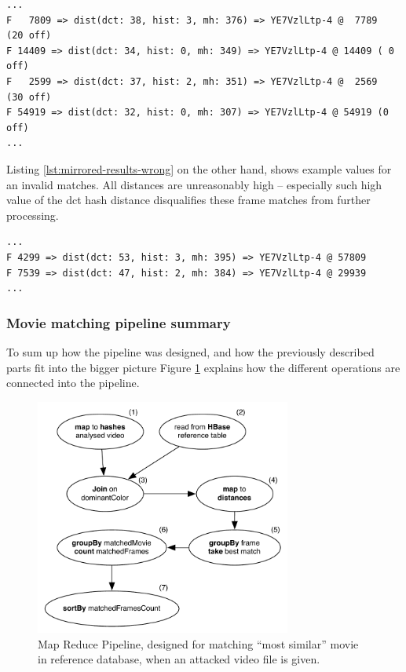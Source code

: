 \begin{lstlisting}[caption={Examples of valid ``best'' matches for a few sample frames (mirrored movie).}, label={lst:mirrored-results}]
...
F   7809 => dist(dct: 38, hist: 3, mh: 376) => YE7VzlLtp-4 @  7789   (20 off)
F 14409 => dist(dct: 34, hist: 0, mh: 349) => YE7VzlLtp-4 @ 14409 ( 0 off)
F   2599 => dist(dct: 37, hist: 2, mh: 351) => YE7VzlLtp-4 @  2569   (30 off)
F 54919 => dist(dct: 32, hist: 0, mh: 307) => YE7VzlLtp-4 @ 54919 (0 off)
...
\end{lstlisting}

Listing \ref{lst:mirrored-results-wrong} on the other hand, shows example values for an invalid matches. All distances are unreasonably high -- especially such high value of the dct hash distance disqualifies these frame matches from further processing.

\begin{lstlisting}[caption={Examples of invalid matches for a few sample frames.}, label={lst:mirrored-results-wrong}]
...
F 4299 => dist(dct: 53, hist: 3, mh: 395) => YE7VzlLtp-4 @ 57809
F 7539 => dist(dct: 47, hist: 2, mh: 384) => YE7VzlLtp-4 @ 29939
...
\end{lstlisting}


\subsubsection{Movie matching pipeline summary}
To sum up how the pipeline was designed, and how the previously described parts fit into the bigger picture Figure \ref{fig:full-job} explains how the different operations are connected into the pipeline.

\begin{figure}[ch!]
  \centering
  \includegraphics[width=0.75\textwidth]{img/top-match-job}
  \caption{Map Reduce Pipeline, designed for matching ``most similar'' movie in reference database, when an attacked video file is given.}
  \label{fig:full-job}
\end{figure}

